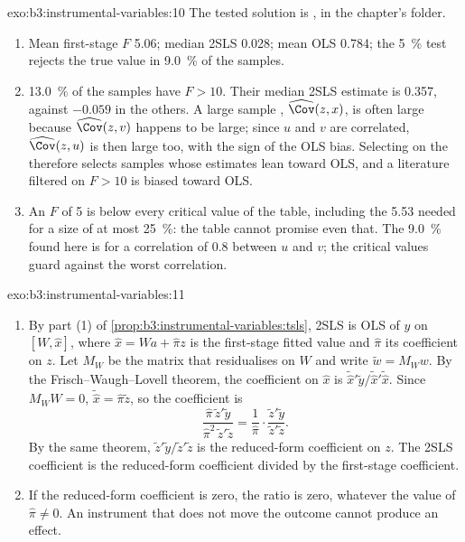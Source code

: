 \begin{solution}{exo:b3:instrumental-variables:10}
The tested solution is , in the chapter's
 folder.
\begin{enumerate}
\item Mean first-stage $F$ 5.06; median 2SLS 0.028; mean OLS 0.784; the 5~\%
test rejects the true value in 9.0~\% of the samples. %
\item 13.0~\% of the samples have $F > 10$. Their median 2SLS estimate is
0.357, against $-0.059$ in the others. %
A large sample , $\widehat{\Cov}(z, x)$, is often large because
$\widehat{\Cov}(z, v)$ happens to be large; since $u$ and $v$ are correlated,
$\widehat{\Cov}(z, u)$ is then large too, with the sign of the OLS bias.
Selecting on the  therefore selects samples whose estimates lean
toward OLS, and a literature filtered on $F > 10$ is biased toward OLS.
\item An $F$ of 5 is below every critical value of the table, including the
5.53 needed for a size of at most 25~\%: the table cannot promise even that.
The 9.0~\% found here is for a correlation of 0.8 between $u$ and $v$; the
critical values guard against the worst correlation.
\end{enumerate}
\end{solution}

\begin{solution}{exo:b3:instrumental-variables:11}
\begin{enumerate}
\item By part (1) of \cref{prop:b3:instrumental-variables:tsls}, 2SLS is OLS of
$y$ on $[W, \hat x]$, where $\hat x = Wa + \hat\pi z$ is the first-stage fitted
value and $\hat\pi$ its coefficient on $z$. Let $M_W$ be the matrix that
residualises on $W$ and write $\tilde w = M_W w$. By the Frisch--Waugh--Lovell
theorem, the coefficient on $\hat x$ is $\tilde{\hat x}'\tilde y/\tilde{\hat
x}'\tilde{\hat x}$. Since $M_W W = 0$, $\tilde{\hat x} = \hat\pi\tilde z$, so
the coefficient is
\[
  \frac{\hat\pi\,\tilde z'\tilde y}{\hat\pi^2\,\tilde z'\tilde z} = \frac{1}{\hat\pi}\cdot\frac{\tilde z'\tilde y}{\tilde z'\tilde z}.
\]
By the same theorem, $\tilde z'\tilde y/\tilde z'\tilde z$ is the reduced-form
coefficient on $z$. The 2SLS coefficient is the reduced-form coefficient
divided by the first-stage coefficient.
\item If the reduced-form coefficient is zero, the ratio is zero, whatever the
value of $\hat\pi \neq 0$. An instrument that does not move the outcome cannot
produce an effect.
\end{enumerate}
\end{solution}

